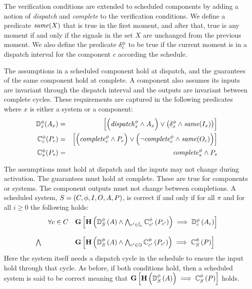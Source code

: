 The verification conditions are extended to scheduled components by adding a notion of \textit{dispatch} and \textit{complete} to the verification conditions.
We define a predicate $\mathit{same}(X)$ that is true in the first moment, and after that, true is any moment if and only if the signals in the set $X$ are unchanged from the previous moment.
We also define the predicate $\delta^\phi_c$ to be true if the current moment is in a dispatch interval for the component $c$ according the schedule.

The assumptions in a scheduled component hold at dispatch, and the guarantees of the same component hold at complete.
A component also assumes its inputs are invariant through the dispatch interval and the outputs are invariant between complete cycles.
These requirements are captured in the following predicates where $x$ is either a system or a component:
\begin{eqnarray*}
  \mathbb{D}^\phi_x(A_x) &=& \left[\left(\mathit{dispatch}^{\phi}_x \wedge A_x\right) \vee \left(\delta^\phi_x \wedge \mathit{same}(I_x)\right)\right] \\
  \mathbb{C}^\phi_c(P_c) &=& \left[\left(\mathit{complete}^{\phi}_c \wedge P_c\right) \vee \left(\neg\mathit{complete}^{\phi}_c \wedge \mathit{same}(O_c)\right)\right] \\
  \mathbb{C}^\phi_s(P_s) &=& \mathit{complete}^{\phi}_s \wedge P_s
\end{eqnarray*}

The assumptions must hold at dispatch and the inputs may not change during activation.
The guarantees must hold at complete.
These are true for components or systems. The component outputs must not change between completions.
A scheduled system, $S = (C, \phi, I, O, A, P)$, is correct if and only if for all $\pi$ and for all $i \ge 0$ the following holds:
\[
\begin{array}{lll}
        & \forall c \in C &  
            \mathbf{G}\left[\mathbf{H}\left(\mathbb{D}^\phi_S\left(A\right) \wedge 
            \bigwedge_{c^\prime \in \mathbb{I}_c} \mathbb{C}^\phi_{c^\prime}\left(P_{c^\prime}\right)\right) 
            \implies \mathbb{D}^\phi_c\left(A_c\right)\right] \\ \\
 \bigwedge &   & 
            \mathbf{G}\left[\mathbf{H}\left(\mathbb{D}^\phi_S\left(A\right) \wedge 
            \bigwedge_{c^\prime \in \mathbb{O}} \mathbb{C}^\phi_{c^\prime}\left(P_{c^\prime}\right)\right)
            \implies \mathbb{C}^\phi_{S}\left(P\right)\right]
\end{array}
\]
Here the system itself needs a dispatch cycle in the schedule to ensure the input hold through that cycle. As before, if both conditions hold, then a scheduled system is said to be correct meaning that $\mathbf{G}\left[\mathbf{H}\left(\mathbb{D}^\phi_S\left(A\right)\right) 
\implies \mathbb{C}^\phi_{S}\left(P\right)\right]$ holds.
